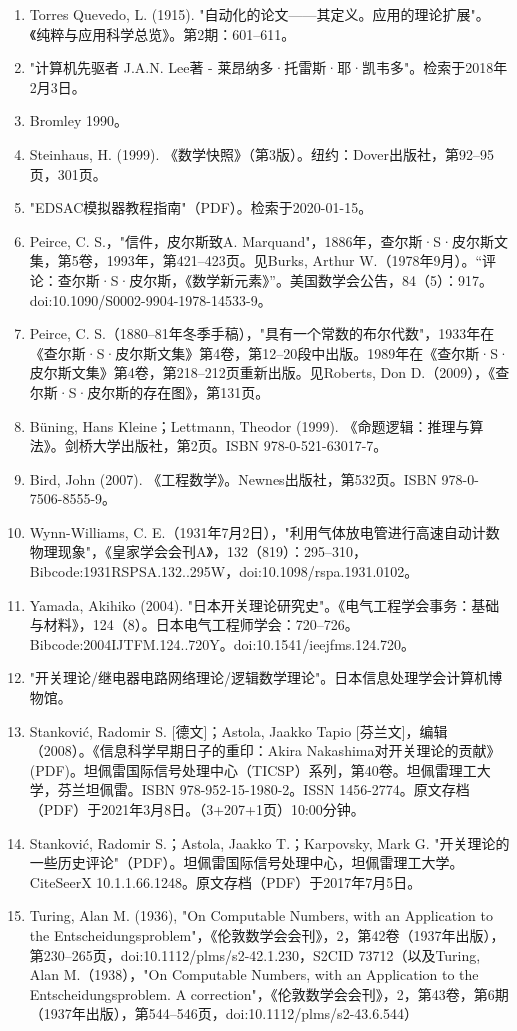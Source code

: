 \begin{enumerate}
\item Torres Quevedo, L. (1915). "自动化的论文——其定义。应用的理论扩展"。《纯粹与应用科学总览》。第2期：601–611。
\item "计算机先驱者 J.A.N. Lee著 - 莱昂纳多·托雷斯·耶·凯韦多"。检索于2018年2月3日。
\item Bromley 1990。
\item Steinhaus, H. (1999). 《数学快照》（第3版）。纽约：Dover出版社，第92–95页，301页。
\item "EDSAC模拟器教程指南"（PDF）。检索于2020-01-15。
\item Peirce, C. S.，"信件，皮尔斯致A. Marquand"，1886年，查尔斯·S·皮尔斯文集，第5卷，1993年，第421–423页。见Burks, Arthur W.（1978年9月）。“评论：查尔斯·S·皮尔斯，《数学新元素》”。美国数学会公告，84（5）：917。doi:10.1090/S0002-9904-1978-14533-9。
\item Peirce, C. S.（1880–81年冬季手稿），"具有一个常数的布尔代数"，1933年在《查尔斯·S·皮尔斯文集》第4卷，第12–20段中出版。1989年在《查尔斯·S·皮尔斯文集》第4卷，第218–212页重新出版。见Roberts, Don D.（2009），《查尔斯·S·皮尔斯的存在图》，第131页。
\item Büning, Hans Kleine；Lettmann, Theodor (1999). 《命题逻辑：推理与算法》。剑桥大学出版社，第2页。ISBN 978-0-521-63017-7。
\item Bird, John (2007). 《工程数学》。Newnes出版社，第532页。ISBN 978-0-7506-8555-9。
\item Wynn-Williams, C. E.（1931年7月2日），"利用气体放电管进行高速自动计数物理现象"，《皇家学会会刊A》，132（819）：295–310，Bibcode:1931RSPSA.132..295W，doi:10.1098/rspa.1931.0102。
\item Yamada, Akihiko (2004). "日本开关理论研究史"。《电气工程学会事务：基础与材料》，124（8）。日本电气工程师学会：720–726。Bibcode:2004IJTFM.124..720Y。doi:10.1541/ieejfms.124.720。
\item "开关理论/继电器电路网络理论/逻辑数学理论"。日本信息处理学会计算机博物馆。
\item Stanković, Radomir S. [德文]；Astola, Jaakko Tapio [芬兰文]，编辑（2008）。《信息科学早期日子的重印：Akira Nakashima对开关理论的贡献》 (PDF)。坦佩雷国际信号处理中心（TICSP）系列，第40卷。坦佩雷理工大学，芬兰坦佩雷。ISBN 978-952-15-1980-2。ISSN 1456-2774。原文存档（PDF）于2021年3月8日。（3+207+1页）10:00分钟。
\item Stanković, Radomir S.；Astola, Jaakko T.；Karpovsky, Mark G. "开关理论的一些历史评论"（PDF）。坦佩雷国际信号处理中心，坦佩雷理工大学。CiteSeerX 10.1.1.66.1248。原文存档（PDF）于2017年7月5日。
\item  Turing, Alan M. (1936), "On Computable Numbers, with an Application to the Entscheidungsproblem"，《伦敦数学会会刊》，2，第42卷（1937年出版），第230–265页，doi:10.1112/plms/s2-42.1.230，S2CID 73712（以及Turing, Alan M.（1938），"On Computable Numbers, with an Application to the Entscheidungsproblem. A correction"，《伦敦数学会会刊》，2，第43卷，第6期（1937年出版），第544–546页，doi:10.1112/plms/s2-43.6.544）

\end{enumerate}
